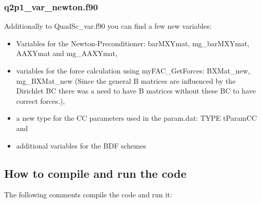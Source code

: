 \subsubsection*{q2p1\_var\_newton.f90} 
Additionally to QuadSc\_var.f90 you can find a few new variables:
\begin{itemize}
\item Variables for the Newton-Preconditioner: barMXYmat, mg\_barMXYmat, AAXYmat and mg\_AAXYmat,
\item variables for the force calculation using myFAC\_GetForces: BXMat\_new, mg\_BXMat\_new (Since the general B matrices are influenced by the Dirichlet BC there was a need to have B matrices without these BC to have correct forces.),
\item a new type for the CC parameters used in the param.dat: TYPE tParamCC and
\item additional variables for the BDF schemes
\end{itemize}

\subsection{How to compile and run the code}
The following comments compile the code and run it:\\
{\scriptsize{}}\\
\\
\\
\\

